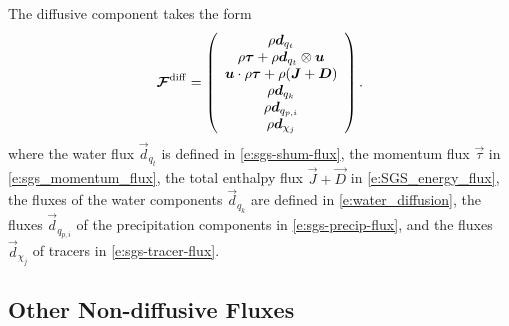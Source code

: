 \documentclass{report}
\begin{document}
 The diffusive component takes the form 
 \begin{equation}
 \boldsymbol{{\mathcal{F}}}^{\mathrm{diff}}=\left( \begin{array}{c}
 \rho\boldsymbol{{d}}_{q_t} \\
 \rho\boldsymbol{{\tau}} + \rho\boldsymbol{{d}}_{q_t} \otimes \boldsymbol{{u}}\\
 \boldsymbol{{u}} \cdot \rho\boldsymbol{{\tau}} + \rho (\boldsymbol{{J}} + \boldsymbol{{D}}) \\
\rho\boldsymbol{{d}}_{q_k}\\
\rho \boldsymbol{{d}}_{q_{p, i}}\\
\rho \boldsymbol{{d}}_{\chi_j}
\end{array}
\right).
\label{e:diff_flux}
\end{equation}
where the water flux $\vec{d}_{q_t}$ is defined in \eqref{e:sgs-shum-flux}, the momentum flux $\vec{\tau}$ in \eqref{e:sgs_momentum_flux}, the total enthalpy flux $\vec{J} + \vec{D}$ in \eqref{e:SGS_energy_flux}, the fluxes of the water components $\vec{d}_{q_k}$ are defined in \eqref{e:water_diffusion}, the fluxes $\vec{d}_{q_{p, i}}$ of the precipitation components in \eqref{e:sgs-precip-flux}, and the fluxes $\vec{d}_{\chi_j}$ of tracers in \eqref{e:sgs-tracer-flux}.


\subsection{Other Non-diffusive Fluxes}
\end{document}
